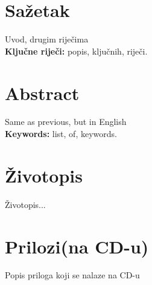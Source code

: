 \documentclass[a4paper,12pt]{extarticle}
\begin{document}
\section*{Sažetak}

Uvod, drugim riječima\\


{\bfseries Ključne riječi:} popis, ključnih, riječi.

\section*{Abstract}

Same as previous, but in English\\


{\bfseries Keywords:} list, of, keywords.

\section*{Životopis}

Životopis... %

\section*{Prilozi(na CD-u)}

Popis priloga koji se nalaze na CD-u
\end{document}
